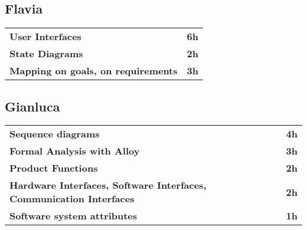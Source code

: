 \subsection*{Flavia}
\begin{table}[H]
    \begin{tabular}{lr}
        \toprule
        \textbf{User Interfaces} & \textbf{6h}  \\
        \textbf{State Diagrams}  & \textbf{2h} \\
        \textbf{Mapping on goals, on requirements} & \textbf{3h}   \\
        \bottomrule
    \end{tabular}
\end{table}

\subsection*{Gianluca}
\begin{table}[H]
    \begin{tabular}{lr}
        \toprule
        \textbf{Sequence diagrams}                                             & \textbf{4h} \\
        \textbf{Formal Analysis with Alloy}                                    & \textbf{3h}  \\
        \textbf{Product Functions}                                             & \textbf{2h} \\
        \textbf{Hardware Interfaces, Software Interfaces, Communication Interfaces}   & \textbf{2h}   \\
        \textbf{Software system attributes}                                    & \textbf{1h}   \\
        \bottomrule
    \end{tabular}
\end{table}
